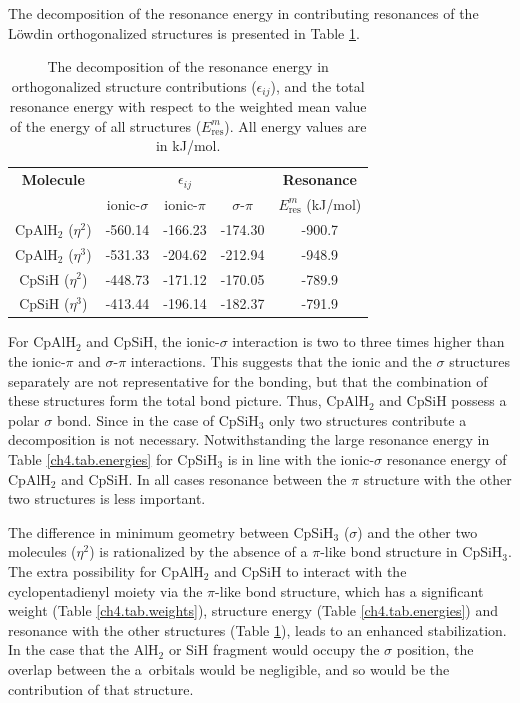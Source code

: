 The decomposition of the resonance energy in contributing resonances of the L\"{o}wdin orthogonalized structures \cite{havenith} is presented in Table \ref{ch4.tab.interactions}.
\begin{table}[htbp]
\caption{The decomposition of the resonance energy in orthogonalized structure contributions ($\epsilon_{ij}$), and the total resonance energy with respect to the weighted mean value of the energy of all structures ($E^m_\mathrm{res}$). All energy values are in kJ/mol.}
\center
\begin{tabular}{|c|ccc|c|}
\hline
\textbf{Molecule}&\multicolumn{3}{c|}{$\epsilon_{ij}$}&\textbf{Resonance}\\
&ionic-$\sigma$&ionic-$\pi$&$\sigma$-$\pi$&$E^m_\mathrm{res}$ (kJ/mol)\\
\hline
CpAlH$_2$ ($\eta^{2}$)& -560.14& -166.23& -174.30& -900.7\\
CpAlH$_2$ ($\eta^{3}$)& -531.33& -204.62& -212.94& -948.9\\
CpSiH ($\eta^{2}$)& -448.73& -171.12& -170.05& -789.9\\
CpSiH ($\eta^{3}$)& -413.44& -196.14& -182.37& -791.9\\

\hline
\end{tabular}
\label{ch4.tab.interactions}
\end{table}
For CpAlH$_2$ and CpSiH, the ionic-$\sigma$ interaction is two to three times higher than the ionic-$\pi$ and $\sigma$-$\pi$ interactions. This suggests that the ionic and the $\sigma$ structures separately are not representative for the bonding, but that the combination of these structures form the total bond picture. Thus, CpAlH$_2$ and CpSiH possess a polar $\sigma$ bond. Since in the case of CpSiH$_3$ only two structures contribute a decomposition is not necessary. Notwithstanding the large resonance energy in Table \ref{ch4.tab.energies} for CpSiH$_3$ is in line with the ionic-$\sigma$ resonance energy of CpAlH$_2$ and CpSiH. In all cases resonance between the $\pi$ structure with the other two structures is less important.

The difference in minimum geometry between CpSiH$_3$ ($\sigma$) and the other two molecules ($\eta^2$) is rationalized by the absence of a $\pi$-like bond structure in CpSiH$_3$. The extra possibility for CpAlH$_2$ and CpSiH to interact with the cyclopentadienyl moiety via the $\pi$-like bond structure, which has a significant weight (Table \ref{ch4.tab.weights}), structure energy (Table \ref{ch4.tab.energies}) and resonance with the other structures (Table \ref{ch4.tab.interactions}), leads to an enhanced stabilization. In the case that the AlH$_2$ or SiH fragment would occupy the $\sigma$ position, the overlap between the a\textquotesingle\textquotesingle\ orbitals would be negligible, and so would be the contribution of that structure.  

